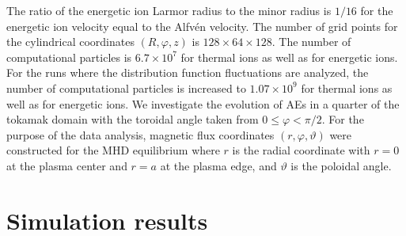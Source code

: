 \documentclass[10pt]{article}
\begin{document}
The ratio of the energetic ion Larmor radius to the minor radius is $1 / 16$ for the energetic ion velocity equal to the Alfvén velocity. The number of grid points for the cylindrical coordinates $(R, \varphi, z)$ is $128 \times 64 \times 128$. The number of computational particles is $6.7 \times 10^{7}$ for thermal ions as well as for energetic ions. For the runs where the distribution function fluctuations are analyzed, the number of computational particles is increased to $1.07 \times 10^{9}$ for thermal ions as well as for energetic ions. We investigate the evolution of AEs in a quarter of the tokamak domain with the toroidal angle taken from $0 \leqslant \varphi<\pi / 2$. For the purpose of the data analysis, magnetic flux coordinates $(r, \varphi, \vartheta)$ were constructed for the MHD equilibrium where $r$ is the radial coordinate with $r=0$ at the plasma center and $r=a$ at the plasma edge, and $\vartheta$ is the poloidal angle.

\section{Simulation results}
\end{document}
